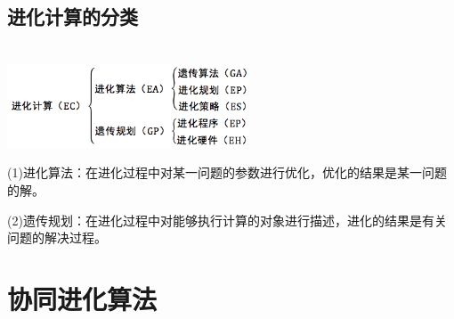 \documentclass[8pt]{article}
\begin{document}
\subsection{进化计算的分类}\\
        \includegraphics[width=0.54\textwidth]{1.png}
\begin{description}    
        \item (1)进化算法：在进化过程中对某一问题的参数进行优化，优化的结果是某一问题的解。
	\item (2)遗传规划：在进化过程中对能够执行计算的对象进行描述，进化的结果是有关问题的解决过程。
	\end{description}
 \section{协同进化算法}
\end{document}
